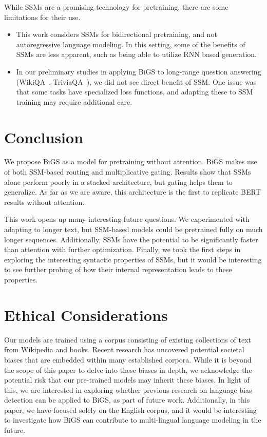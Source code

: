 While SSMs are a promising technology for pretraining, there are some limitations for their use.

\begin{itemize}
    \item This work considers SSMs for bidirectional pretraining, and not autoregressive language modeling. In this setting, some of the benefits of SSMs are less apparent, such as being able to utilize RNN based generation. 

    \item In our preliminary studies in applying BiGS to long-range question answering (WikiQA~\cite{yang2015wikiqa}, TriviaQA~\cite{joshi2017triviaqa}), we did not see direct benefit of SSM. One issue was that some tasks have specialized loss functions, and adapting these to SSM training may require additional care.  
\end{itemize}

\section{Conclusion}
We propose BiGS as a model for pretraining without attention. BiGS makes use of both SSM-based routing and multiplicative gating. Results show that SSMs alone perform poorly in a stacked architecture, but gating helps them to generalize. As far as we are aware, this architecture is the first to replicate BERT results without attention.

This work opens up many interesting future questions. We experimented with adapting to longer text, but SSM-based models could be pretrained fully on much longer sequences. Additionally, SSMs have the potential to be significantly faster than attention with further optimization. Finally, we took the first steps in exploring the interesting syntactic properties of SSMs, but it would be interesting to see further probing of how their internal representation leads to these properties. 

\section{Ethical Considerations} Our models are trained using a corpus consisting of existing collections of text from Wikipedia and books. Recent research has uncovered potential societal biases that are embedded within many established corpora. While it is beyond the scope of this paper to delve into these biases in depth, we acknowledge the potential risk that our pre-trained models may inherit these biases. In light of this, we are interested in exploring whether previous research on language bias detection can be applied to BiGS, as part of future work. Additionally, in this paper, we have focused solely on the English corpus, and it would be interesting to investigate how BiGS can contribute to multi-lingual language modeling in the future.



